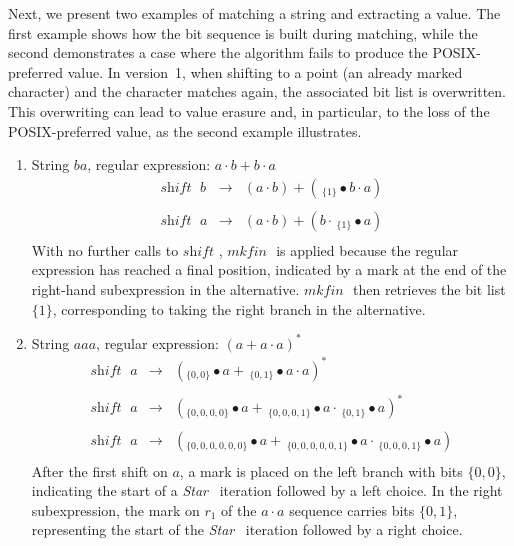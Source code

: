 \documentclass[12pt]{article}
\newcommand{\shift}{\textit{shift }}
\newcommand{\Star}{\textit{Star }}
\newcommand{\mkfin}{\textit{mkfin }}
\begin{document}
Next, we present two examples of matching a string and extracting a value.  
The first example shows how the bit sequence is built during matching,  
while the second demonstrates a case where the algorithm fails to produce the POSIX-preferred value.  
In version~1, when shifting to a point (an already marked character) and the character matches again,  
the associated bit list is overwritten.  
This overwriting can lead to value erasure and, in particular, to the loss of the POSIX-preferred value,  
as the second example illustrates.  

\begin{enumerate}
  \item String $ba$, regular expression: $a \cdot b + b \cdot a$
  \[
    \begin{array}{rcl}
      \shift\; b & \rightarrow & (a \cdot b) + (\,_{\{1\}} \bullet b \cdot a)\\\\
      \shift\; a & \rightarrow & (a \cdot b) + (b \cdot \,_{\{1\}} \bullet a)\\
    \end{array}
  \]
  With no further calls to $\shift$, $\mkfin$ is applied because the regular expression 
  has reached a final position, indicated by a mark at the end of the right-hand subexpression in 
  the alternative. $\mkfin$ then retrieves the bit list $\{1\}$, corresponding to taking the 
  right branch in the alternative.

  \item String $aaa$, regular expression: $(a + a \cdot a)^*$
  \[
    \begin{array}{rcl}
      \shift\; a & \rightarrow & (_{\{0,0\}} \bullet a + \,_{\{0,1\}} \bullet a \cdot a)^*\\\\
      \shift\; a & \rightarrow & (_{\{0,0,0,0\}} \bullet a + \,_{\{0,0,0,1\}} \bullet a \cdot \,_{\{0,1\}} \bullet a)^*\\\\
      \shift\; a & \rightarrow & (_{\{0,0,0,0,0,0\}} \bullet a + \,_{\{0,0,0,0,0,1\}} \bullet a \cdot \,_{\{0,0,0,1\}} \bullet a)\\
    \end{array}
  \]
  After the first shift on $a$, a mark is placed on the left branch with bits $\{0,0\}$,
  indicating the start of a \Star\ iteration followed by a left choice. In the right subexpression,
  the mark on $r_1$ of the $a \cdot a$ sequence carries bits $\{0,1\}$, representing the start of the \Star\
  iteration followed by a right choice.


\end{enumerate}
\end{document}
